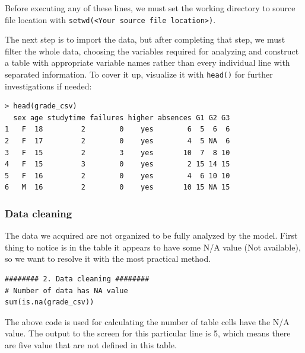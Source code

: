\documentclass[a4paper]{article}
\numberwithin{equation}{section}
\begin{document}
Before executing any of these lines, we must set the working directory to source file location with \texttt{setwd(<Your source file location>)}.

The next step is to import the data, but after completing that step, we must filter the whole data, choosing the variables required for analyzing and construct a table with appropriate variable names rather than every individual line with separated information. To cover it up, visualize it with \texttt{head()} for further investigations if needed:

\begin{mdframed}[leftline=false,rightline=false,backgroundcolor=teal!10,nobreak=true]
  \begin{verbatim}
> head(grade_csv)
  sex age studytime failures higher absences G1 G2 G3
1   F  18         2        0    yes        6  5  6  6
2   F  17         2        0    yes        4  5 NA  6
3   F  15         2        3    yes       10  7  8 10
4   F  15         3        0    yes        2 15 14 15
5   F  16         2        0    yes        4  6 10 10
6   M  16         2        0    yes       10 15 NA 15
  \end{verbatim}
\end{mdframed}


\subsubsection{Data cleaning}
The data we acquired are not organized to be fully analyzed by the model. First thing to notice is in the table it appears to have some N/A value (Not available), so we want to resolve it with the most practical method.

\begin{mdframed}[leftline=false,rightline=false,backgroundcolor=magenta!10,nobreak=true]
  \begin{verbatim}
######## 2. Data cleaning ########
# Number of data has NA value
sum(is.na(grade_csv))
  \end{verbatim}
\end{mdframed}

The above code is used for calculating the number of table cells have the N/A value. The output to the screen for this particular line is 5, which means there are five value that are not defined in this table.
\end{document}
